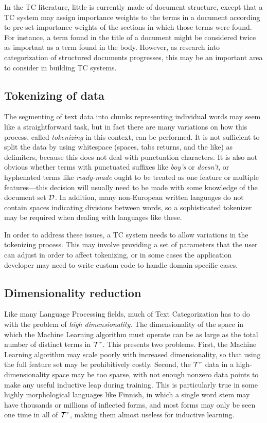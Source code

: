 In the TC literature, little is currently made of document structure,
except that a TC system may assign importance weights to the terms in
a document according to pre-set importance weights of the sections in
which those terms were found.  For instance, a term found in the title
of a document might be considered twice as important as a term found
in the body.  However, as research into categorization of structured
documents progresses, this may be an important area to consider in
building TC systems.

\subsection{Tokenizing of data}

The segmenting of text data into chunks representing individual words
may seem like a straightforward task, but in fact there are many
variations on how this process, called \emph{tokenizing} in this
context, can be performed.\cite[p. XXX]{manning:99} It is not
sufficient to split the data by using whitespace (spaces, tabs
returns, and the like) as delimiters, because this does not deal with
punctuation characters.  It is also not obvious whether terms with
punctuated suffixes like \emph{boy's} or \emph{doesn't}, or hyphenated terms
like \emph{ready-made} ought to be treated as one feature or multiple
features---this decision will usually need to be made with some
knowledge of the document set $\mathcal{D}$.  In addition, many non-European
written languages do not contain spaces indicating divisions between
words, so a sophisticated tokenizer may be required when dealing with
languages like these.

In order to address these issues, a TC system needs to allow
variations in the tokenizing process.  This may involve providing a
set of parameters that the user can adjust in order to affect
tokenizing, or in some cases the application developer may need to
write custom code to handle domain-specific cases.

\subsection{Dimensionality reduction}

Like many Language Processing fields, much of Text Categorization has
to do with the problem of \emph{high dimensionality}.
\cite[p. 13]{sebastiani:02} \cite[p. XXX]{manning:99} The
dimensionality of the space in which the Machine Learning algorithm
must operate can be as large as the total number of distinct terms in
$\mathcal{T}^r$.  This presents two problems.  First, the Machine Learning
algorithm may scale poorly with increased dimensionality, so that
using the full feature set may be prohibitively costly.  Second, the
$\mathcal{T}^r$ data in a high-dimensionality space may be too sparse, with
not enough nonzero data points to make any useful inductive leap
during training.  This is particularly true in some highly
morphological languages like Finnish, in which a single word stem may
have thousands or millions of inflected forms, and most forms may only
be seen one time in all of $\mathcal{T}^r$, making them almost useless for
inductive learning.

